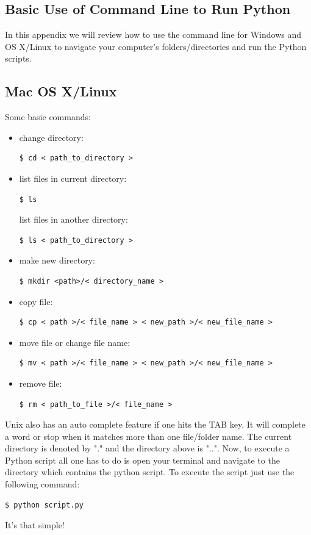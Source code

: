 \documentclass{SciPost}
\newcommand\0{\scalebox{-1}[1]{0}}
\let\svttfamily\ttfamily
\renewcommand\ttfamily{\svttfamily\catcode`0=\active }
\begin{document}
\begin{appendix}
\section{Basic Use of Command Line to Run Python}
\label{app:cmd_line}

In this appendix we will review how to use the command line for Windows and OS X/Linux to navigate your computer's folders/directories and run the Python scripts.

\subsection{Mac OS X/Linux}
Some basic commands:

\begin{itemize}
	\item change directory:
	\begin{lstlisting}[numbers=none,keywordstyle=\ttfamily]
	$ cd < path_to_directory >
	\end{lstlisting}
	\item list files in current directory:
	\begin{lstlisting}[numbers=none,keywordstyle=\ttfamily]
	$ ls 
	\end{lstlisting}
	list files in another directory:
	\begin{lstlisting}[numbers=none,keywordstyle=\ttfamily]
	$ ls < path_to_directory >
	\end{lstlisting}
	\item make new directory:
	\begin{lstlisting}[numbers=none,keywordstyle=\ttfamily]
	$ mkdir <path>/< directory_name >
	\end{lstlisting}
	\item copy file:
	\begin{lstlisting}[numbers=none,keywordstyle=\ttfamily]
	$ cp < path >/< file_name > < new_path >/< new_file_name >
	\end{lstlisting}
	\item move file or change file name:
	\begin{lstlisting}[numbers=none]
	$ mv < path >/< file_name > < new_path >/< new_file_name >
	\end{lstlisting}
	\item remove file:
	\begin{lstlisting}[numbers=none,keywordstyle=\ttfamily]
	$ rm < path_to_file >/< file_name >
	\end{lstlisting}
	
\end{itemize}
Unix also has an auto complete feature if one hits the TAB key. It will complete a word or stop when it matches more than one file/folder name. The current directory is denoted by "." and the directory above is "..".
%
Now, to execute a Python script all one has to do is open your terminal and navigate to the directory which contains the python script. To execute the script just use the following command:
\begin{lstlisting}[numbers=none,keywordstyle=\ttfamily]
$ python script.py
\end{lstlisting}
It's that simple!


\end{appendix}
\end{document}
